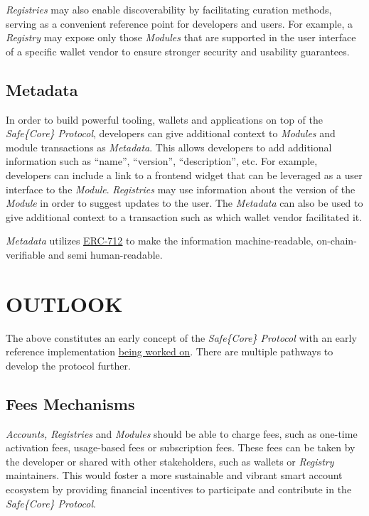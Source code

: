 \documentclass[
]{article}
\begin{document}
\emph{Registries} may also enable discoverability by facilitating curation methods, serving as a convenient reference point for developers and users. For example, a \emph{Registry} may expose only those \emph{Modules} that are supported in the user interface of a specific wallet vendor to ensure stronger security and usability guarantees.

\hypertarget{metadata}{%
  \subsection{Metadata}\label{metadata}}

In order to build powerful tooling, wallets and applications on top of the \emph{Safe\{Core\} Protocol}, developers can give additional context to \emph{Modules} and module transactions as \emph{Metadata}. This allows developers to add additional information such as ``name'', ``version'', ``description'', etc. For example, developers can include a link to a frontend widget that can be leveraged as a user interface to the \emph{Module}. \emph{Registries} may use information about the version of the \emph{Module} in order to suggest updates to the user. The \emph{Metadata} can also be used to give additional context to a transaction such as which wallet vendor facilitated it.

\emph{Metadata} utilizes \href{https://eips.ethereum.org/EIPS/eip-712}{\uline{ERC-712}} to make the information machine-readable, on-chain-verifiable and semi human-readable.

\hypertarget{outlook}{%
  \section{OUTLOOK}\label{outlook}}

The above constitutes an early concept of the \emph{Safe\{Core\} Protocol} with an early reference implementation \href{https://github.com/safe-global/safe-core-protocol-specs}{\uline{being worked on}}. There are multiple pathways to develop the protocol further.

\hypertarget{fees-mechanisms}{%
  \subsection{Fees Mechanisms}\label{fees-mechanisms}}

\emph{Accounts, Registries} and \emph{Modules} should be able to charge fees, such as one-time activation fees, usage-based fees or subscription fees. These fees can be taken by the developer or shared with other stakeholders, such as wallets or \emph{Registry} maintainers. This would foster a more sustainable and vibrant smart account ecosystem by providing financial incentives to participate and contribute in the \emph{Safe\{Core\} Protocol}.
\end{document}
